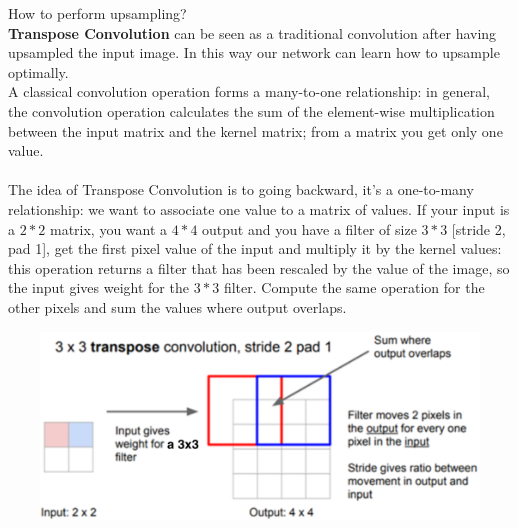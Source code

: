 How to perform upsampling?\\
\textbf{Transpose Convolution} can be seen as a traditional convolution after having upsampled the input image. In this way our network can learn how to upsample optimally. \\
A classical convolution operation forms a many-to-one relationship: in general, the convolution operation calculates the sum of the element-wise multiplication between the input matrix and the kernel matrix; from a matrix you get only one value.  \\ \\
The idea of Transpose Convolution is to going backward, it's a one-to-many relationship: we want to associate one value to a matrix of values. If your input is a $2*2$ matrix, you want a $4*4$ output and you have a filter of size $3*3$ [stride 2, pad 1], get the first pixel value of the input and multiply it by the kernel values: this operation returns a filter that has been rescaled by the value of the image, so the input gives weight for the $3*3$ filter. Compute the same operation for the other pixels and sum the values where output overlaps. \\

\begin{minipage}{\linewidth}
        \centering
        \includegraphics[width=15cm, height=5cm]{images/transpose_conv.png}
        \label{fig:log_arch}
\end{minipage} \\ 

